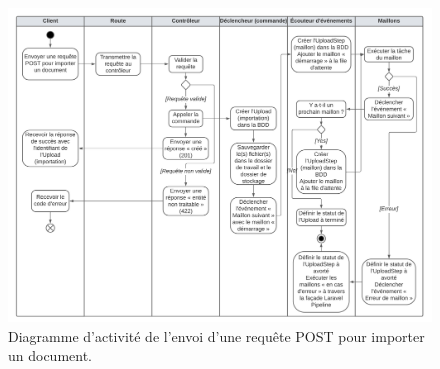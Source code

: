 \begin{figure}
    \centering
    \includegraphics[width=\textwidth]{img/import-activity-diagram}
    \caption{Diagramme d'activité de l'envoi d'une requête POST pour importer un document.}
    \label{fig:import-activity-diagram}
\end{figure}